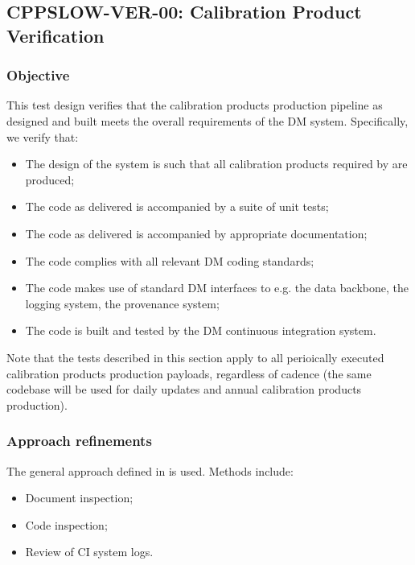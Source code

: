 \subsection{CPPSLOW-VER-00: Calibration Product Verification}
\label{cppslow-ver-00}

\subsubsection{Objective}

This test design verifies that the calibration products production pipeline as
designed and built meets the overall requirements of the DM system.
Specifically, we verify that:

\begin{itemize}

  \item{The design of the system is such that all calibration products
  required by  are produced;}

  \item{The code as delivered is accompanied by a suite of unit tests;}

  \item{The code as delivered is accompanied by appropriate documentation;}

  \item{The code complies with all relevant DM coding standards;}

  \item{The code makes use of standard DM interfaces to e.g. the data
  backbone, the logging system, the provenance system;}

  \item{The code is built and tested by the DM continuous integration system.}

\end{itemize}

Note that the tests described in this section apply to all perioically
executed calibration products production payloads, regardless of cadence (the
same codebase will be used for daily updates and annual calibration products
production).

\subsubsection{Approach refinements}

The general approach defined in  is used. Methods include:

\begin{itemize}

  \item{Document inspection;}
  \item{Code inspection;}
  \item{Review of CI system logs.}

\end{itemize}

